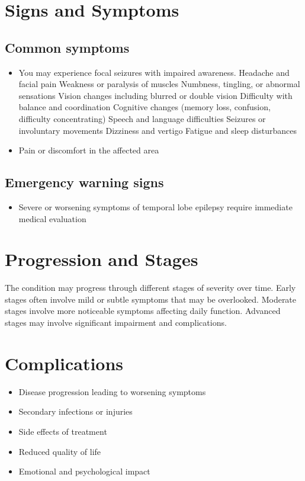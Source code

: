 \section{Signs and Symptoms}
\subsection{Common symptoms}
\begin{itemize}[noitemsep]
  \item You may experience focal seizures with impaired awareness. Headache and facial pain Weakness or paralysis of muscles Numbness, tingling, or abnormal sensations Vision changes including blurred or double vision Difficulty with balance and coordination Cognitive changes (memory loss, confusion, difficulty concentrating) Speech and language difficulties Seizures or involuntary movements Dizziness and vertigo Fatigue and sleep disturbances
  \item Pain or discomfort in the affected area
  \end{itemize}
\subsection{Emergency warning signs}
\begin{itemize}[noitemsep]
  \item Severe or worsening symptoms of temporal lobe epilepsy require immediate medical evaluation
\end{itemize}
\section{Progression and Stages}
The condition may progress through different stages of severity over time. Early stages often involve mild or subtle symptoms that may be overlooked. Moderate stages involve more noticeable symptoms affecting daily function. Advanced stages may involve significant impairment and complications.
\section{Complications}
\begin{itemize}[noitemsep]
  \item Disease progression leading to worsening symptoms
  \item Secondary infections or injuries
  \item Side effects of treatment
  \item Reduced quality of life
  \item Emotional and psychological impact
\end{itemize}
